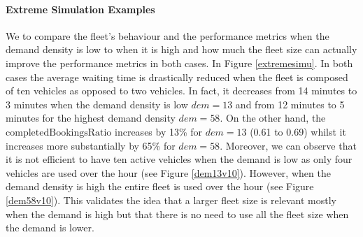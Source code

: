 \documentclass[12pt,a4paper]{article}
\begin{document}
\paragraph{Extreme Simulation Examples}
We to compare the fleet's behaviour and the performance metrics when the demand density is low to when it is high and how much the fleet size can actually improve the performance metrics in both cases. In Figure \ref{extremesimu}. In both cases the average waiting time is drastically reduced when the fleet is composed of ten vehicles as opposed to two vehicles. In fact, it decreases from 14 minutes to 3 minutes when the demand density is low $dem=13$ and from 12 minutes to 5 minutes for the highest demand density $dem = 58$. On the other hand, the $\text{completedBookingsRatio}$ increases by 13\% for $dem = 13$ (0.61 to 0.69) whilst it increases more substantially by 65\% for $dem = 58$. Moreover, we can observe that it is not efficient to have ten active vehicles when the demand is low as only four vehicles are used over the hour (see Figure \ref{dem13v10}). However, when the demand density is high the entire fleet is used over the hour (see Figure \ref{dem58v10}). This validates the idea that a larger fleet size is relevant mostly when the demand is high but that there is no need to use all the fleet size when the demand is lower.
\end{document}
